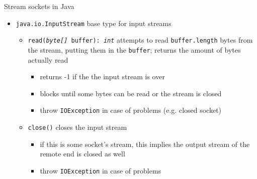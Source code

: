 \documentclass{beamer}\mode<presentation>{\usetheme{AMSBolognaFC}}
\begin{document}
\begin{frame}[c, allowframebreaks]{Stream sockets in Java}
\begin{itemize}
        \item \texttt{java.io.\alert{InputStream}} base type for input streams 
        \begin{itemize}
            \item \alert{\texttt{read(\textit{byte[]} buffer): \textit{int}}} attempts to read \texttt{buffer.length} bytes from the stream, putting them in the \texttt{buffer}; returns the amount of bytes actually read
            \begin{itemize}
                \item returns -1 if the the input stream is over
                \item blocks until some bytes can be read or the stream is closed
                \item throw \texttt{IOException} in case of problems (e.g. closed socket)
            \end{itemize}
            \item \alert{\texttt{close()}} closes the input stream
            \begin{itemize}
                \item if this is some socket's stream, this implies the output stream of the remote end is closed as well
                \item throw \texttt{IOException} in case of problems
            \end{itemize}
        \end{itemize}

        \framebreak


\end{itemize}
\end{frame}
\end{document}
